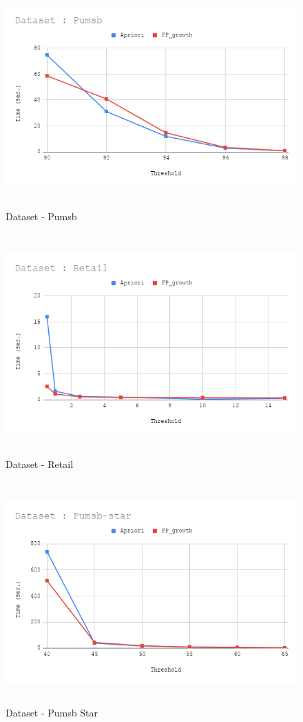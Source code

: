 \documentclass[12pt]{article}
\begin{document}
\begin{figure}[ht!]
	\centering
	\includegraphics[width = 0.95\columnwidth, height = 8.5cm]{Pumsb.png}
	\caption{Dataset - Pumsb}
	\label{fig:pumsb}
\end{figure}

\begin{figure}[ht!]
	\centering
	\includegraphics[width = 0.95\columnwidth, height = 8.5cm]{Retail.png}
	\caption{Dataset - Retail}
	\label{fig:retail}
\end{figure}

\begin{figure}[ht!]
	\centering
	\includegraphics[width = 0.95\columnwidth, height = 8.5cm]{Pumsb-star.png}
	\caption{Dataset - Pumsb Star}
	\label{fig:pbs}
\end{figure}
\end{document}
